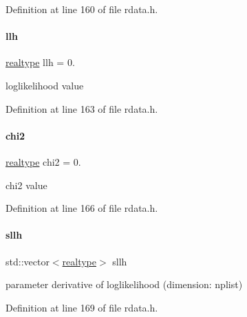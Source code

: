 Definition at line 160 of file rdata.\+h.

\mbox{\label{classamici_1_1_return_data_a35c3d895b14746807521fa6ba8ead52b}} 
\paragraph{\texorpdfstring{llh}{llh}}
{\footnotesize\ttfamily \mbox{\hyperlink{namespaceamici_a1bdce28051d6a53868f7ccbf5f2c14a3}{realtype}} llh = 0.}

loglikelihood value 

Definition at line 163 of file rdata.\+h.

\mbox{\label{classamici_1_1_return_data_a473f438e422f5fbf6c5753a95b3324fe}} 
\paragraph{\texorpdfstring{chi2}{chi2}}
{\footnotesize\ttfamily \mbox{\hyperlink{namespaceamici_a1bdce28051d6a53868f7ccbf5f2c14a3}{realtype}} chi2 = 0.}

chi2 value 

Definition at line 166 of file rdata.\+h.

\mbox{\label{classamici_1_1_return_data_a1696cb94c7712b468ee3e021c6df0c89}} 
\paragraph{\texorpdfstring{sllh}{sllh}}
{\footnotesize\ttfamily std\+::vector$<$\mbox{\hyperlink{namespaceamici_a1bdce28051d6a53868f7ccbf5f2c14a3}{realtype}}$>$ sllh}

parameter derivative of loglikelihood (dimension\+: nplist) 

Definition at line 169 of file rdata.\+h.

\mbox{\label{classamici_1_1_return_data_a4087bea95b64c7ecc21bb4c487b255d9}} 
